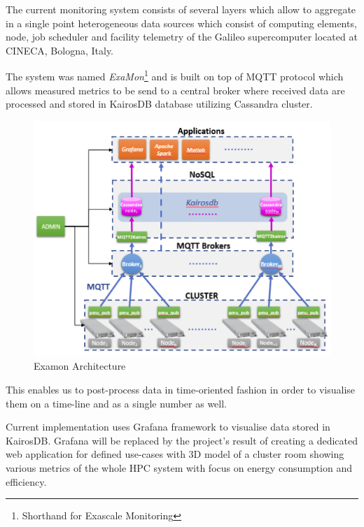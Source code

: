 \documentclass[a4paper, twoside]{article}
\newcommand{\highlight}[1]{\textcolor{prace-orange}{#1}}
\begin{document}
\begin{multicols}{3}

\lettrine[lines=4,nindent=0em]{\highlight{T}}{}he current monitoring system\cite{current} consists of several layers which allow to aggregate in a single point heterogeneous data sources which consist of computing elements, node, job scheduler and facility telemetry of the Galileo supercomputer located at CINECA, Bologna, Italy.

The system was named \textit{ExaMon}\footnote{Shorthand for Exascale Monitoring} and is built on top of MQTT protocol\cite{mqtt} which allows measured metrics to be send to a central broker where received data are processed and stored in KairosDB\cite{kairos} database utilizing Cassandra cluster.

\begin{figure}[H]
    \includegraphics[width=0.9\linewidth]{examon-architecture}
    \caption{Examon Architecture}
    \label{arch}
\end{figure}

This enables us to post-process data in time-oriented fashion in order to visualise them on a time-line and as a single number as well.

Current implementation uses Grafana framework to visualise data stored in KairosDB. Grafana will be replaced by the project's result of creating a dedicated web application for defined use-cases with 3D model of a cluster room showing various metrics of the whole HPC system with focus on energy consumption and efficiency.


\end{multicols}
\end{document}
